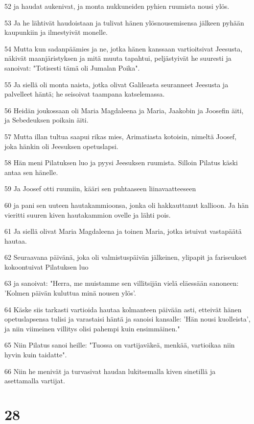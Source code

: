 \par 52 ja haudat aukenivat, ja monta nukkuneiden pyhien ruumista nousi ylös.
\par 53 Ja he lähtivät haudoistaan ja tulivat hänen ylösnousemisensa jälkeen pyhään kaupunkiin ja ilmestyivät monelle.
\par 54 Mutta kun sadanpäämies ja ne, jotka hänen kanssaan vartioitsivat Jeesusta, näkivät maanjäristyksen ja mitä muuta tapahtui, peljästyivät he suuresti ja sanoivat: "Totisesti tämä oli Jumalan Poika".
\par 55 Ja siellä oli monta naista, jotka olivat Galileasta seuranneet Jeesusta ja palvelleet häntä; he seisoivat taampana katselemassa.
\par 56 Heidän joukossaan oli Maria Magdaleena ja Maria, Jaakobin ja Joosefin äiti, ja Sebedeuksen poikain äiti.
\par 57 Mutta illan tultua saapui rikas mies, Arimatiasta kotoisin, nimeltä Joosef, joka hänkin oli Jeesuksen opetuslapsi.
\par 58 Hän meni Pilatuksen luo ja pyysi Jeesuksen ruumista. Silloin Pilatus käski antaa sen hänelle.
\par 59 Ja Joosef otti ruumiin, kääri sen puhtaaseen liinavaatteeseen
\par 60 ja pani sen uuteen hautakammioonsa, jonka oli hakkauttanut kallioon. Ja hän vieritti suuren kiven hautakammion ovelle ja lähti pois.
\par 61 Ja siellä olivat Maria Magdaleena ja toinen Maria, jotka istuivat vastapäätä hautaa.
\par 62 Seuraavana päivänä, joka oli valmistuspäivän jälkeinen, ylipapit ja fariseukset kokoontuivat Pilatuksen luo
\par 63 ja sanoivat: "Herra, me muistamme sen villitsijän vielä eläessään sanoneen: 'Kolmen päivän kuluttua minä nousen ylös'.
\par 64 Käske siis tarkasti vartioida hautaa kolmanteen päivään asti, etteivät hänen opetuslapsensa tulisi ja varastaisi häntä ja sanoisi kansalle: 'Hän nousi kuolleista', ja niin viimeinen villitys olisi pahempi kuin ensimmäinen."
\par 65 Niin Pilatus sanoi heille: "Tuossa on vartijaväkeä, menkää, vartioikaa niin hyvin kuin taidatte".
\par 66 Niin he menivät ja turvasivat haudan lukitsemalla kiven sinetillä ja asettamalla vartijat.

\chapter{28}

